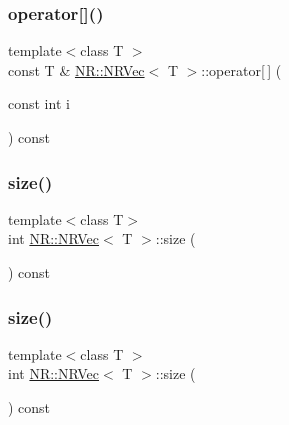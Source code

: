 \mbox{\label{classNR_1_1NRVec_adce699639e1489a7b9b95651aa9d9410}} 
\subsubsection{\texorpdfstring{operator[]()}{operator[]()}\hspace{0.1cm}{\footnotesize\ttfamily [4/4]}}
{\footnotesize\ttfamily template$<$class T $>$ \\
const T \& \mbox{\hyperlink{classNR_1_1NRVec}{N\+R\+::\+N\+R\+Vec}}$<$ T $>$\+::operator\mbox{[}$\,$\mbox{]} (\begin{DoxyParamCaption}\item[{const int}]{i }\end{DoxyParamCaption}) const\hspace{0.3cm}{\ttfamily [inline]}}

\mbox{\label{classNR_1_1NRVec_ab0dfb2d7ce74022fa0ce42138f4a224b}} 
\subsubsection{\texorpdfstring{size()}{size()}\hspace{0.1cm}{\footnotesize\ttfamily [1/2]}}
{\footnotesize\ttfamily template$<$class T$>$ \\
int \mbox{\hyperlink{classNR_1_1NRVec}{N\+R\+::\+N\+R\+Vec}}$<$ T $>$\+::size (\begin{DoxyParamCaption}{ }\end{DoxyParamCaption}) const\hspace{0.3cm}{\ttfamily [inline]}}

\mbox{\label{classNR_1_1NRVec_ab0dfb2d7ce74022fa0ce42138f4a224b}} 
\subsubsection{\texorpdfstring{size()}{size()}\hspace{0.1cm}{\footnotesize\ttfamily [2/2]}}
{\footnotesize\ttfamily template$<$class T $>$ \\
int \mbox{\hyperlink{classNR_1_1NRVec}{N\+R\+::\+N\+R\+Vec}}$<$ T $>$\+::size (\begin{DoxyParamCaption}{ }\end{DoxyParamCaption}) const\hspace{0.3cm}{\ttfamily [inline]}}

